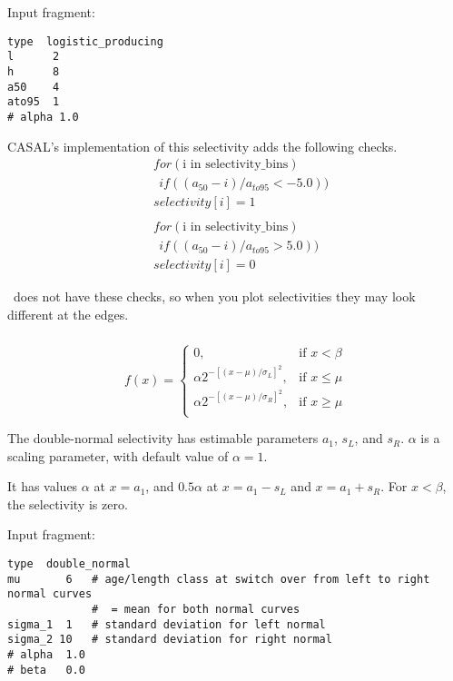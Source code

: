 Input fragment: {\small{\begin{verbatim}
type  logistic_producing
l      2
h      8
a50    4
ato95  1
# alpha 1.0
\end{verbatim}}}

CASAL's implementation of this selectivity adds the following checks.
\begin{align*}
	&for(\text{i in selectivity\_bins}) \\
	& \ \ if((a_{50} - i)/a_{to95} < -5.0))\\
	&selectivity[i] = 1 \\ \\ 
&for(\text{i in selectivity\_bins}) \\
& \ \ if((a_{50} - i)/a_{to95} > 5.0))\\
&selectivity[i] = 0
\end{align*}

\CNAME\ does not have these checks, so when you plot selectivities they may look different at the edges.

\subsubsection[Double-normal]{}\label{sec:Selectivity-DoubleNormal}

\begin{equation}
  f(x) = \begin{cases}
     0, & \text{if $x < \beta$} \\
    \alpha 2^{-[(x- \mu)/\sigma_L ]^2}, & \text{if $x \leq \mu$} \\
    \alpha 2^{-[(x- \mu)/\sigma_R ]^2}, & \text{if $x \ge \mu$}\\
  \end{cases}
\end{equation}

The double-normal selectivity has estimable parameters $a_1$, $s_L$, and $s_R$. $\alpha$ is a scaling parameter, with default value of $\alpha = 1$. 

It has values $\alpha$ at $x=a_1$, and $0.5 \alpha$ at $x=a_1-s_L$ and $x=a_1+s_R$. For $x < \beta$, the selectivity is zero.

Input fragment: {\small{\begin{verbatim}
type  double_normal
mu       6   # age/length class at switch over from left to right normal curves
             #  = mean for both normal curves
sigma_1  1   # standard deviation for left normal
sigma_2 10   # standard deviation for right normal
# alpha  1.0
# beta   0.0
\end{verbatim}}}

